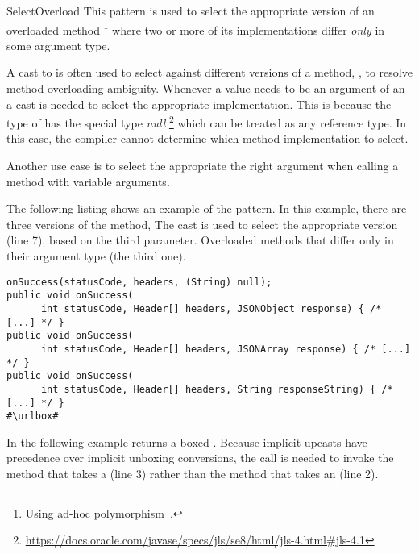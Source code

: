\begin{pattern}{SelectOverload}
This pattern is used to select the appropriate version of an overloaded method%
\footnote{Using ad-hoc polymorphism~\citep{stracheyFundamentalConceptsProgramming2000}.}
where two or more of its implementations differ \emph{only} in some argument type.

A cast to  is often used to select against different versions of a method,
\ie{}, to resolve method overloading ambiguity.
Whenever a  value needs to be an argument of an a cast is
needed to select the appropriate implementation.
This is because the type of  has the special type \emph{null}%
\footnote{\url{https://docs.oracle.com/javase/specs/jls/se8/html/jls-4.html\#jls-4.1}}
which can be treated as any reference type.
In this case,
the compiler cannot determine which method implementation to select.

Another use case is to select the appropriate the right argument when calling a method with variable arguments.

\instances{}
The following listing shows an example of the \thisp{} pattern.
In this example, there are three versions of the  method,
The cast  is used to select the appropriate version
(line 7), based on the third parameter.
Overloaded methods that differ only in their argument type (the third one).

\def\urlvar{http://bit.ly/loopj_android_async_http_2FENovD}
\begin{verbatim}
onSuccess(statusCode, headers, (String) null);
public void onSuccess(
      int statusCode, Header[] headers, JSONObject response) { /* [...] */ }
public void onSuccess(
      int statusCode, Header[] headers, JSONArray response) { /* [...] */ }
public void onSuccess(
      int statusCode, Header[] headers, String responseString) { /* [...] */ }
#\urlbox#
\end{verbatim}

In the following example  returns a boxed .
Because implicit upcasts have precedence over implicit unboxing conversions,
the call is needed to invoke the method that takes a  (line 3) rather than the method that takes an  (line 2).


\end{pattern}
